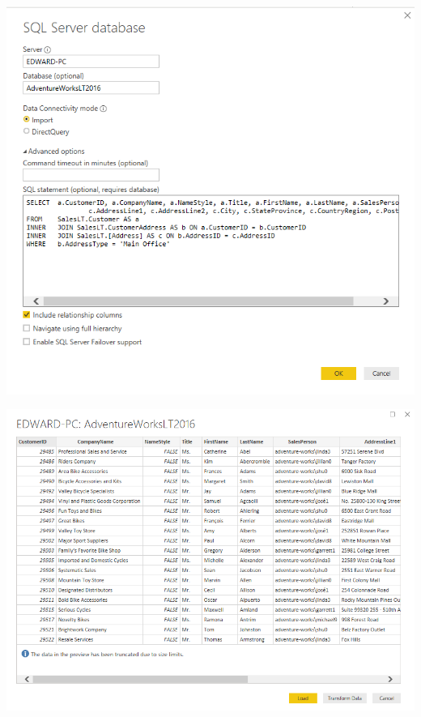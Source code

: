 \documentclass[12pt,letterpaper]{article}
\begin{document}
\begin{center}
\includegraphics[width=15cm]{images/5}\newline
\end{center}
\begin{center}
\includegraphics[width=15cm]{images/6}\newline
\end{center}
\end{document}

